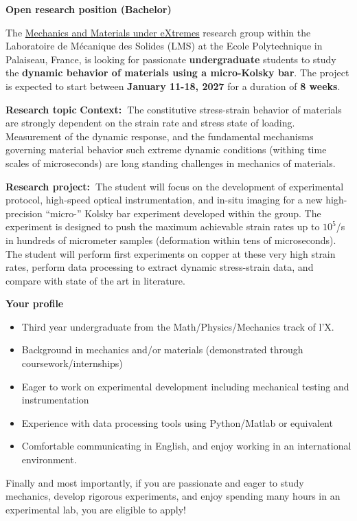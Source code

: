\documentclass[a4paper,11pt,fleqn]{article}
\begin{document}
	\setlength{\abovedisplayskip}{2 pt}
	\setlength{\belowdisplayskip}{2 pt}
	\sffamily
	\thispagestyle{titlepage}
	\begin{center}
		\vspace*{0em}
		\Large \textbf{Open research position (Bachelor)} 
	\end{center}
	
	The \href{https://vigneshkannan-group.github.io/vk-mxm-website/}{Mechanics and Materials under eXtremes} research group within the Laboratoire de M{\'e}canique des Solides (LMS) at the Ecole Polytechnique in Palaiseau, France, is looking for passionate \textbf{undergraduate} students to study the \textbf{dynamic behavior of materials using a micro-Kolsky bar}. The project is expected to start between \textbf{January 11-18, 2027} for a duration of \textbf{8 weeks}.

	\begin{myhlbox}{\textbf{Research topic}}
		\textbf{Context:~}The constitutive stress-strain behavior of materials are strongly dependent on the strain rate and stress state of loading. Measurement of the dynamic response, and the fundamental mechanisms governing material behavior such extreme dynamic conditions (withing time scales of microseconds) are long standing challenges in mechanics of materials.
		
		\textbf{Research project:~}The student will focus on the development of experimental protocol, high-speed optical instrumentation, and in-situ imaging for a new high-precision ``micro-'' Kolsky bar experiment developed within the group. The experiment is designed to push the maximum achievable strain rates up to $10^{5}$/s in hundreds of micrometer samples (deformation within tens of microseconds). The student will perform first experiments on copper at these very high strain rates, perform data processing to extract dynamic stress-strain data, and compare with state of the art in literature.
	
	\end{myhlbox}
	
	\begin{myhlbox}{\textbf{Your profile}}
		\begin{itemize}[leftmargin=*, itemsep=-0.25em]
			\item Third year undergraduate from the Math/Physics/Mechanics track of l'X. 
			\item Background in mechanics and/or materials (demonstrated through coursework/internships)
			\item Eager to work on experimental development including mechanical testing and instrumentation
			\item Experience with data processing tools using Python/Matlab or equivalent 
			\item Comfortable communicating in English, and enjoy working in an international environment. 
		\end{itemize}
		\vspace{0em}
		Finally and most importantly, if you are passionate and eager to study mechanics, develop rigorous experiments, and enjoy spending many hours in an experimental lab, you are eligible to apply!
	\end{myhlbox}
	
\end{document}
